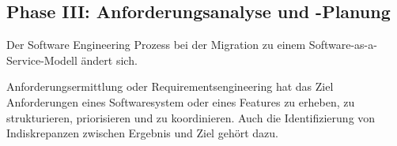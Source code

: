 \subsection{Phase III: Anforderungsanalyse und -Planung}
Der Software Engineering Prozess bei der Migration zu einem 
Software-as-a-Service-Modell ändert sich. 

Anforderungsermittlung oder Requirementsengineering hat das Ziel Anforderungen 
eines Softwaresystem oder eines Features zu erheben, zu strukturieren, 
priorisieren und zu koordinieren. 
 Auch die Identifizierung von 
Indiskrepanzen zwischen Ergebnis und Ziel gehört dazu. 

